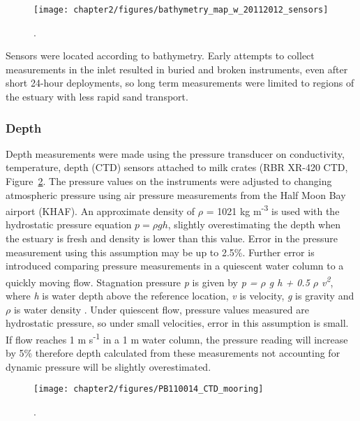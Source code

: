 \begin{figure}
	\begin{center}
		\texttt{[image: chapter2/figures/bathymetry\_map\_w\_20112012\_sensors]} \caption{.}\label{fig:BathyCh2}
	\end{center}
\end{figure}


Sensors were located according to bathymetry. Early attempts to collect measurements in the inlet resulted in buried and broken instruments, even after short 24-hour deployments, so long term measurements were limited to regions of the estuary with less rapid sand transport. 

\subsubsection{Depth} \label{sssec:depth}
Depth measurements were made using the pressure transducer on conductivity, temperature, depth (CTD) sensors
attached to milk crates (RBR XR-420 CTD, Figure~\ref{fig:CTDphoto}. The pressure values on the instruments were adjusted to
changing atmospheric pressure using air pressure measurements from the Half Moon Bay airport (KHAF). An approximate density of $\rho$ = 1021 kg m\textsuperscript{-3} is used with the hydrostatic pressure equation ${p = \rho g h}$, slightly overestimating the depth when the estuary is fresh and density is lower than this value. Error in the pressure measurement using this assumption may be up to 2.5\%. Further error is introduced comparing pressure measurements in a quiescent water column to a quickly moving flow. Stagnation pressure \emph{p} is given by \emph{p = $\rho$ g h +  0.5 $\rho$ v\textsuperscript{2}}, where \emph{h} is water depth above the reference location, \emph{v} is velocity, \emph{g} is gravity and \emph{$\rho$} is water density \parencite{young_brief_2004}. Under quiescent flow, pressure values measured are hydrostatic pressure, so under small velocities, error in this assumption is small. If flow reaches 1 m s\textsuperscript{-1} in a 1 m water column, the pressure reading will increase by 5\% therefore depth calculated from these measurements not accounting for dynamic pressure will be slightly overestimated.

\begin{figure}
	\begin{center}
		\texttt{[image: chapter2/figures/PB110014\_CTD\_mooring]} \caption{.}\label{fig:CTDphoto}
	\end{center}
\end{figure}


